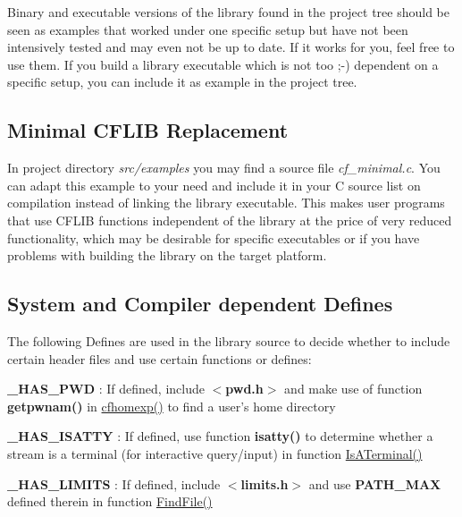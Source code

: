 \begin{DoxyItemize}
\item Binary and executable versions of the library found in the project tree should be seen as examples that worked under one specific setup but have not been intensively tested and may even not be up to date. If it works for you, feel free to use them. If you build a library executable which is not too ;-\/) dependent on a specific setup, you can include it as example in the project tree.
\end{DoxyItemize}\hypertarget{development_minimal_replacement}{}\subsection{Minimal C\-F\-L\-I\-B Replacement}\label{development_minimal_replacement}
In project directory {\itshape src/examples\/} you may find a source file {\itshape cf\-\_\-minimal.\-c\/}. You can adapt this example to your need and include it in your C source list on compilation instead of linking the library executable. This makes user programs that use C\-F\-L\-I\-B functions independent of the library at the price of very reduced functionality, which may be desirable for specific executables or if you have problems with building the library on the target platform.\hypertarget{development_compilation_options}{}\subsection{System and Compiler dependent Defines}\label{development_compilation_options}
The following Defines are used in the library source to decide whether to include certain header files and use certain functions or defines\-:


\begin{DoxyItemize}
\item {\bfseries \-\_\-\-H\-A\-S\-\_\-\-P\-W\-D} \-: If defined, include {\bfseries $<$pwd.\-h$>$} and make use of function {\bfseries getpwnam()} in \hyperlink{group__advanced__features_ga469258ed449ac26d5c82e665db491ff2}{cfhomexp()} to find a user's home directory
\begin{DoxyItemize}
\item {\bfseries \-\_\-\-H\-A\-S\-\_\-\-I\-S\-A\-T\-T\-Y} \-: If defined, use function {\bfseries isatty()} to determine whether a stream is a terminal (for interactive query/input) in function \hyperlink{group__utilities_ga9a90e738d03b642f33901600671d225a}{Is\-A\-Terminal()}
\item {\bfseries \-\_\-\-H\-A\-S\-\_\-\-L\-I\-M\-I\-T\-S} \-: If defined, include {\bfseries $<$limits.\-h$>$} and use {\bfseries P\-A\-T\-H\-\_\-\-M\-A\-X} defined therein in function \hyperlink{group__utilities_ga59fc2b29cf26051e0854b664f5aed15d}{Find\-File()}
\end{DoxyItemize}
\end{DoxyItemize}

